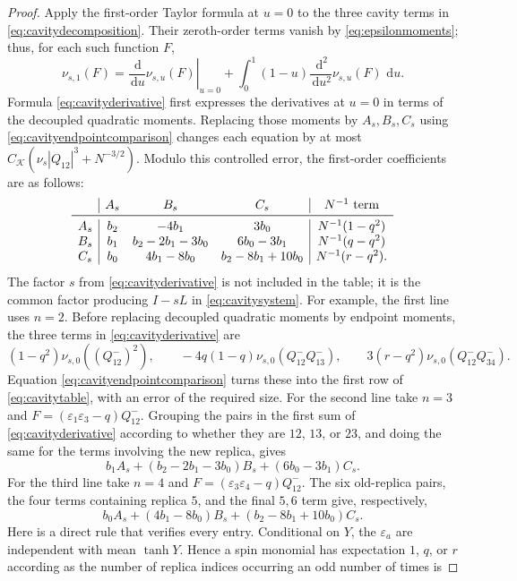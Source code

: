 \documentclass[11pt]{article}
\numberwithin{equation}{section}
\theoremstyle{plain}
\theoremstyle{definition}
\newcommand{\1}{\mathbf 1}
\newcommand{\cK}{\mathcal K}
\newcommand{\dd}{\,\mathrm d}
\begin{document}
\begin{proof}
Apply the first-order Taylor formula at $u=0$ to the three cavity
terms in \eqref{eq:cavitydecomposition}.  Their zeroth-order terms vanish by
\eqref{eq:epsilonmoments}; thus, for each such function $F$,
\[
 \nu_{s,1}(F)=
 \left.\frac{\dd}{\dd u}\nu_{s,u}(F)\right|_{u=0}
 +\int_0^1(1-u)\frac{\dd^2}{\dd u^2}\nu_{s,u}(F)\,\dd u.
\]
Formula \eqref{eq:cavityderivative} first
expresses the derivatives at $u=0$ in terms of the decoupled quadratic
moments.  Replacing those moments by $A_s,B_s,C_s$ using
\eqref{eq:cavityendpointcomparison} changes each equation by at most
$C_{\cK}(\nu_s|Q_{12}|^3+N^{-3/2})$.  Modulo this controlled error, the
first-order coefficients are as follows:
\begin{equation}
\begin{array}{c|ccc|c}
 &A_s&B_s&C_s&N^{-1}\text{ term}\\ \midrule
 A_s&b_2&-4b_1&3b_0&N^{-1}(1-q^2)\\
 B_s&b_1&b_2-2b_1-3b_0&6b_0-3b_1&N^{-1}(q-q^2)\\
 C_s&b_0&4b_1-8b_0&b_2-8b_1+10b_0&N^{-1}(r-q^2).
\end{array}
\label{eq:cavitytable}
\end{equation}
The factor $s$ from \eqref{eq:cavityderivative} is not included in
the table; it is the common factor producing $I-sL$ in
\eqref{eq:cavitysystem}.
For example, the first line uses $n=2$.  Before replacing decoupled
quadratic moments by endpoint moments, the three terms in
\eqref{eq:cavityderivative} are
\[
 (1-q^2)\nu_{s,0}((Q^-_{12})^2),\qquad
 -4q(1-q)\nu_{s,0}(Q^-_{12}Q^-_{13}),\qquad
 3(r-q^2)\nu_{s,0}(Q^-_{12}Q^-_{34}).
\]
Equation \eqref{eq:cavityendpointcomparison} turns these into the first
row of \eqref{eq:cavitytable}, with an error of the required size.
For the second line take $n=3$ and
$F=(\varepsilon_1\varepsilon_3-q)Q^-_{12}$.  Grouping the pairs in the
first sum of \eqref{eq:cavityderivative} according to whether they are
$12$, $13$, or $23$, and doing the same for the terms involving the
new replica, gives
\[
 b_1A_s+(b_2-2b_1-3b_0)B_s+(6b_0-3b_1)C_s.
\]
For the third line take $n=4$ and
$F=(\varepsilon_3\varepsilon_4-q)Q^-_{12}$.  The six old-replica
pairs, the four terms containing replica $5$, and the final
$5,6$ term give, respectively,
\[
 b_0A_s+(4b_1-8b_0)B_s+(b_2-8b_1+10b_0)C_s.
\]
Here is a direct rule that verifies every entry.  Conditional on $Y$,
the $\varepsilon_a$ are independent with mean $\tanh Y$.  Hence a
spin monomial has expectation $1$, $q$, or $r$ according as the
number of replica indices occurring an odd number of times is

\end{proof}
\end{document}
